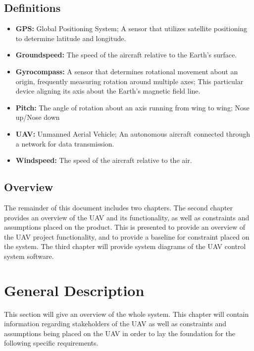 \documentclass[titlepage]{article}
\begin{document}
\subsection{Definitions}
\begin{itemize}
\item \textbf{GPS: } Global Positioning System; A sensor that utilizes satellite positioning to determine latitude and longitude.
\item \textbf{Groundspeed: } The speed of the aircraft relative to the Earth's surface.
\item \textbf{Gyrocompass: } A sensor that determines rotational movement about an origin, frequently measuring rotation around multiple axes; This particular device aligning its axis about the Earth's magnetic field line.
\item \textbf{Pitch: } The angle of rotation about an axis running from wing to wing; Nose up/Nose down
\item \textbf{UAV: } Unmanned Aerial Vehicle; An autonomous aircraft connected through a network for data transmission.
\item \textbf{Windspeed: } The speed of the aircraft relative to the air. 
\end{itemize}

\subsection{Overview}
The remainder of this document includes two chapters. The second chapter provides an overview of the UAV  and its functionality, as well as constraints and assumptions placed on the product. This is presented to provide an overview of the UAV project functionality, and to provide a baseline for constraint placed on the system. The third chapter will provide system diagrams of the UAV control system software.

\section{General Description}
This section will give an overview of the whole system. This chapter will contain information regarding stakeholders of the UAV as well as constraints and assumptions being placed on the UAV in order to lay the foundation for the following specific requirements.
\end{document}
